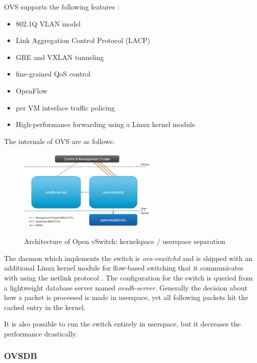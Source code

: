 OVS supports the following features \cite{ovs-readme}:
\begin{itemize}
\item 802.1Q VLAN model
\item Link Aggregation Control Protocol (LACP)
\item GRE and VXLAN tunneling
\item fine-grained QoS control
\item OpenFlow
\item per VM interface traffic policing
\item High-performance forwarding using a Linux kernel module
\end{itemize}

\newpage
The internals of OVS are as follows:

\begin{figure}[H]
\centering
\includegraphics[width=0.6\textwidth]{images/fundamentals/openvswitch_architecture.png}
\caption{Architecture of Open vSwitch: kernelspace / userspace separation}  \cite{prognetworkingovs}
\end{figure}

The daemon which implements the switch is \textit{ovs-vswitchd} and is shipped with an additional Linux kernel module for flow-based switching that it communicates with using the netlink protocol \cite{ovsdeepdive}. The configuration for the switch is queried from a lightweight database server named \textit{ovsdb-server}.
Generally the decision about how a packet is processed is made in userspace, yet all following packets hit the cached entry in the kernel.

It is also possible to run the switch entirely in userspace, but it decreases the performance drastically.


\subsubsection{OVSDB}

